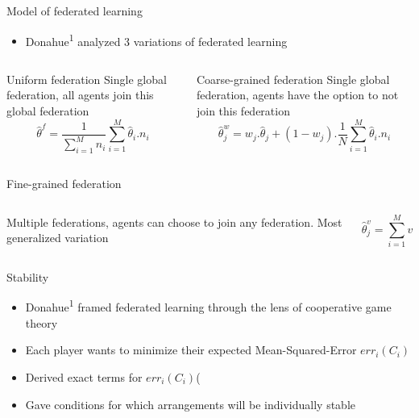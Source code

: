 \documentclass[aspectratio=169]{beamer}
\begin{document}
\begin{frame}[label={sec:org6a5dafc}]{Model of federated learning}
\begin{itemize}
\item Donahue\textsuperscript{1} analyzed 3 variations of federated learning
\end{itemize}


\begin{columns}
\begin{column}{0.45\columnwidth}
\begin{block}{Uniform federation}
Single global federation, all agents join this global federation
\[ \hat{\theta}^f = \frac{1}{\sum_{i=1}^M n_i} \sum_{i=1}^M \hat{\theta}_i . n_i \]
\end{block}
\end{column}

\begin{column}{0.45\columnwidth}
\begin{block}{Coarse-grained federation}
Single global federation, agents have the option to not join this federation
\[ \hat{\theta}^w_j = w_j . \hat{\theta}_j + (1 - w_j) . \frac{1}{N} \sum_{i=1}^M \hat{\theta}_i . n_i \]
\end{block}
\end{column}
\end{columns}
\begin{block}{Fine-grained federation}
\begin{columns}
\begin{column}{0.6\columnwidth}
Multiple federations, agents can choose to join any federation. Most generalized variation
\end{column}

\begin{column}{0.3\columnwidth}
\[ \hat{\theta}^v_j = \sum_{i=1}^M v_{ji} \hat{\theta}_i \]
\end{column}
\end{columns}
\end{block}
\end{frame}

\begin{frame}[label={sec:org94e75b2}]{Stability}
\begin{itemize}
\item Donahue\textsuperscript{1} framed federated learning through the lens of cooperative game theory
\item Each player wants to minimize their expected Mean-Squared-Error \(err_i(C_i)\)
\item Derived exact terms for \(err_i(C_i)\)(
\item Gave conditions for which arrangements will be individually stable
\end{itemize}

\end{frame}
\end{document}
